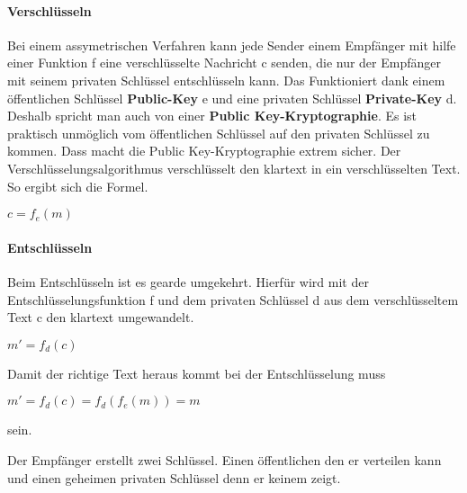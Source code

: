 \paragraph{Verschlüsseln}
Bei einem assymetrischen Verfahren kann jede Sender einem Empfänger mit hilfe einer Funktion f eine verschlüsselte Nachricht c senden, die nur der Empfänger mit seinem privaten Schlüssel entschlüsseln kann. Das Funktioniert dank einem öffentlichen Schlüssel \textbf{Public-Key} e und eine privaten Schlüssel \textbf{Private-Key} d. \\
Deshalb spricht man auch von einer  \textbf{Public Key-Kryptographie}. Es ist praktisch unmöglich vom öffentlichen Schlüssel auf den privaten Schlüssel zu kommen. Dass macht die Public Key-Kryptographie extrem sicher. 
Der Verschlüsselungsalgorithmus verschlüsselt den klartext in ein verschlüsselten Text. So ergibt sich die Formel.
\begin{center}
$ c = f_e (m) $
\end{center}
\paragraph{Entschlüsseln}
Beim Entschlüsseln ist es gearde umgekehrt. Hierfür wird mit der Entschlüsselungsfunktion f und dem privaten Schlüssel d aus dem verschlüsseltem Text c den klartext umgewandelt.
\begin{center}
$ m' = f_d (c) $
\end{center}
Damit der richtige Text heraus kommt bei der Entschlüsselung muss 
\begin{center}
$ m' = f_d (c) = f_d(f_e(m))  = m$
\end{center}
sein.


Der Empfänger erstellt zwei Schlüssel. Einen öffentlichen den er verteilen kann und einen geheimen privaten Schlüssel denn er keinem zeigt. 
